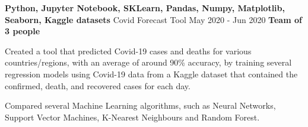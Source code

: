   \cventry
    {\textbf{Python, Jupyter Notebook, SKLearn, Pandas, Numpy, Matplotlib, Seaborn, Kaggle datasets}} %
    {Covid Forecast Tool \href{https://github.com/EduRibeiro00/CovidForecast-feup-iart}{\faExternalLink}} %
    {May 2020 - Jun 2020} %
    {\textbf{Team of 3 people}} %
    {
      \begin{cvitems} %
        \item {Created a tool that predicted Covid-19 cases and deaths for various countries/regions, with an average of around 90\% accuracy, by training several regression models using Covid-19 data from a Kaggle dataset that contained the confirmed, death, and recovered cases for each day.}
        \item {Compared several Machine Learning algorithms, such as Neural Networks, Support Vector Machines, K-Nearest Neighbours and Random Forest.}
      \end{cvitems}
    }